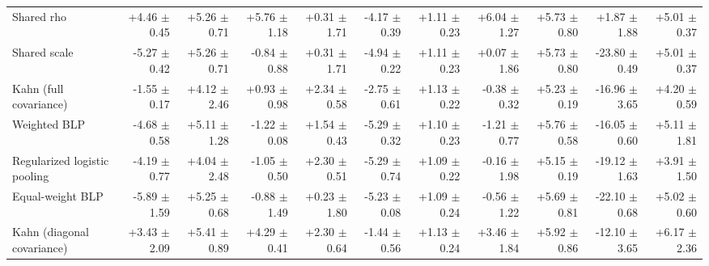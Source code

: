 \begin{tabular}{lrrrrrrrrrr}
Shared rho & +4.46 {\scriptsize $\pm$ 0.45} & +5.26 {\scriptsize $\pm$ 0.71} & +5.76 {\scriptsize $\pm$ 1.18} & +0.31 {\scriptsize $\pm$ 1.71} & -4.17 {\scriptsize $\pm$ 0.39} & +1.11 {\scriptsize $\pm$ 0.23} & +6.04 {\scriptsize $\pm$ 1.27} & +5.73 {\scriptsize $\pm$ 0.80} & +1.87 {\scriptsize $\pm$ 1.88} & +5.01 {\scriptsize $\pm$ 0.37} \\
Shared scale & -5.27 {\scriptsize $\pm$ 0.42} & +5.26 {\scriptsize $\pm$ 0.71} & -0.84 {\scriptsize $\pm$ 0.88} & +0.31 {\scriptsize $\pm$ 1.71} & -4.94 {\scriptsize $\pm$ 0.22} & +1.11 {\scriptsize $\pm$ 0.23} & +0.07 {\scriptsize $\pm$ 1.86} & +5.73 {\scriptsize $\pm$ 0.80} & -23.80 {\scriptsize $\pm$ 0.49} & +5.01 {\scriptsize $\pm$ 0.37} \\
Kahn (full covariance) & -1.55 {\scriptsize $\pm$ 0.17} & +4.12 {\scriptsize $\pm$ 2.46} & +0.93 {\scriptsize $\pm$ 0.98} & +2.34 {\scriptsize $\pm$ 0.58} & -2.75 {\scriptsize $\pm$ 0.61} & +1.13 {\scriptsize $\pm$ 0.22} & -0.38 {\scriptsize $\pm$ 0.32} & +5.23 {\scriptsize $\pm$ 0.19} & -16.96 {\scriptsize $\pm$ 3.65} & +4.20 {\scriptsize $\pm$ 0.59} \\
Weighted BLP & -4.68 {\scriptsize $\pm$ 0.58} & +5.11 {\scriptsize $\pm$ 1.28} & -1.22 {\scriptsize $\pm$ 0.08} & +1.54 {\scriptsize $\pm$ 0.43} & -5.29 {\scriptsize $\pm$ 0.32} & +1.10 {\scriptsize $\pm$ 0.23} & -1.21 {\scriptsize $\pm$ 0.77} & +5.76 {\scriptsize $\pm$ 0.58} & -16.05 {\scriptsize $\pm$ 0.60} & +5.11 {\scriptsize $\pm$ 1.81} \\
Regularized logistic pooling & -4.19 {\scriptsize $\pm$ 0.77} & +4.04 {\scriptsize $\pm$ 2.48} & -1.05 {\scriptsize $\pm$ 0.50} & +2.30 {\scriptsize $\pm$ 0.51} & -5.29 {\scriptsize $\pm$ 0.74} & +1.09 {\scriptsize $\pm$ 0.22} & -0.16 {\scriptsize $\pm$ 1.98} & +5.15 {\scriptsize $\pm$ 0.19} & -19.12 {\scriptsize $\pm$ 1.63} & +3.91 {\scriptsize $\pm$ 1.50} \\
Equal-weight BLP & -5.89 {\scriptsize $\pm$ 1.59} & +5.25 {\scriptsize $\pm$ 0.68} & -0.88 {\scriptsize $\pm$ 1.49} & +0.23 {\scriptsize $\pm$ 1.80} & -5.23 {\scriptsize $\pm$ 0.08} & +1.09 {\scriptsize $\pm$ 0.24} & -0.56 {\scriptsize $\pm$ 1.22} & +5.69 {\scriptsize $\pm$ 0.81} & -22.10 {\scriptsize $\pm$ 0.68} & +5.02 {\scriptsize $\pm$ 0.60} \\
Kahn (diagonal covariance) & +3.43 {\scriptsize $\pm$ 2.09} & +5.41 {\scriptsize $\pm$ 0.89} & +4.29 {\scriptsize $\pm$ 0.41} & +2.30 {\scriptsize $\pm$ 0.64} & -1.44 {\scriptsize $\pm$ 0.56} & +1.13 {\scriptsize $\pm$ 0.24} & +3.46 {\scriptsize $\pm$ 1.84} & +5.92 {\scriptsize $\pm$ 0.86} & -12.10 {\scriptsize $\pm$ 3.65} & +6.17 {\scriptsize $\pm$ 2.36} \\

\end{tabular}
